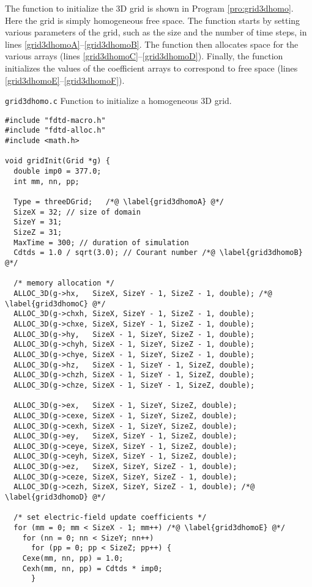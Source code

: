 The function to initialize the 3D grid is shown in Program
\ref{pro:grid3dhomo}.  Here the grid is simply homogeneous free space.
The function starts by setting various parameters of the grid, such as
the size and the number of time steps, in lines
\ref{grid3dhomoA}--\ref{grid3dhomoB}.  The function then allocates
space for the various arrays (lines
\ref{grid3dhomoC}--\ref{grid3dhomoD}).  Finally, the function
initializes the values of the coefficient arrays to correspond to free
space (lines \ref{grid3dhomoE}--\ref{grid3dhomoF}).

\begin{program}
{\tt grid3dhomo.c} Function to initialize a homogeneous 3D grid.
\label{pro:grid3dhomo}
\codemiddle
\begin{lstlisting}
#include "fdtd-macro.h"
#include "fdtd-alloc.h"
#include <math.h>

void gridInit(Grid *g) {
  double imp0 = 377.0;
  int mm, nn, pp;

  Type = threeDGrid;   /*@ \label{grid3dhomoA} @*/
  SizeX = 32; // size of domain
  SizeY = 31;
  SizeZ = 31;
  MaxTime = 300; // duration of simulation
  Cdtds = 1.0 / sqrt(3.0); // Courant number /*@ \label{grid3dhomoB} @*/

  /* memory allocation */
  ALLOC_3D(g->hx,   SizeX, SizeY - 1, SizeZ - 1, double); /*@ \label{grid3dhomoC} @*/
  ALLOC_3D(g->chxh, SizeX, SizeY - 1, SizeZ - 1, double);
  ALLOC_3D(g->chxe, SizeX, SizeY - 1, SizeZ - 1, double);
  ALLOC_3D(g->hy,   SizeX - 1, SizeY, SizeZ - 1, double);
  ALLOC_3D(g->chyh, SizeX - 1, SizeY, SizeZ - 1, double);
  ALLOC_3D(g->chye, SizeX - 1, SizeY, SizeZ - 1, double);
  ALLOC_3D(g->hz,   SizeX - 1, SizeY - 1, SizeZ, double);
  ALLOC_3D(g->chzh, SizeX - 1, SizeY - 1, SizeZ, double);
  ALLOC_3D(g->chze, SizeX - 1, SizeY - 1, SizeZ, double);

  ALLOC_3D(g->ex,   SizeX - 1, SizeY, SizeZ, double);
  ALLOC_3D(g->cexe, SizeX - 1, SizeY, SizeZ, double);
  ALLOC_3D(g->cexh, SizeX - 1, SizeY, SizeZ, double);
  ALLOC_3D(g->ey,   SizeX, SizeY - 1, SizeZ, double);
  ALLOC_3D(g->ceye, SizeX, SizeY - 1, SizeZ, double);
  ALLOC_3D(g->ceyh, SizeX, SizeY - 1, SizeZ, double);
  ALLOC_3D(g->ez,   SizeX, SizeY, SizeZ - 1, double);
  ALLOC_3D(g->ceze, SizeX, SizeY, SizeZ - 1, double);
  ALLOC_3D(g->cezh, SizeX, SizeY, SizeZ - 1, double); /*@ \label{grid3dhomoD} @*/
  
  /* set electric-field update coefficients */
  for (mm = 0; mm < SizeX - 1; mm++) /*@ \label{grid3dhomoE} @*/
    for (nn = 0; nn < SizeY; nn++) 
      for (pp = 0; pp < SizeZ; pp++) {
	Cexe(mm, nn, pp) = 1.0;
	Cexh(mm, nn, pp) = Cdtds * imp0;
      }


\end{lstlisting}
\end{program}

